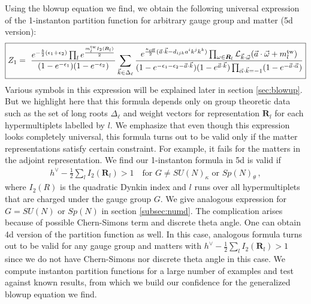 \documentclass[letterpaper, 11pt]{article}
\def\CL{{\cal L}}
\def\e{\epsilon}
\def\w{\omega}
\def\half{\frac{1}{2}}
\begin{document}
Using the blowup equation we find, we obtain the following universal expression of the 1-instanton partition function for arbitrary gauge group and matter (5d version):
\begin{align}
\boxed{
  Z_1=\ \frac{e^{-\frac{b}{2}(\e_1 + \e_2)}\prod_{l}e^{\frac{m^\text{tw}_l I_2(\boldsymbol{R}_l)}{2}}}{(1-e^{-\e_1})(1-e^{-\e_2})} \sum_{\vec{k}\in\Delta_\ell}\frac{e^{\frac{\kappa_{\text{eff}}}{2}(\vec{a}\cdot\vec{k}-d_{ijk}a^ik^jk^k)}\prod_{\w \in \boldsymbol{R}_l} \CL_{\vec{k}\cdot\vec{\w}}(\vec{a}\cdot \vec{\w} + m_{l}^\text{tw})}{(1-e^{-\e_1-\e_2-\vec{a}\cdot\vec{k}})(1-e^{\vec{a}\cdot\vec{k}})\prod_{\vec{\alpha}\cdot \vec{k}=-1}(1-e^{-\vec{a}\cdot\vec{\alpha}})}}
\end{align} 
Various symbols in this expression will be explained later in section \ref{sec:blowup}. But we highlight here that this formula depends only on group theoretic data such as the set of long roots $\Delta_\ell$ and weight vectors for representation $\mathbf{R}_l$ for each hypermultiplets labelled by $l$. 
We emphasize that even though this expression looks completely universal, this formula turns out to be valid only if the matter representations satisfy certain constraint. For example, it fails for the matters in the adjoint representation. We find our 1-instanton formula in 5d is valid if 
\begin{align}
  h^\vee -\frac{1}{2}\sum_l I_2(\mathbf{R}_l) > 1 \quad \textrm{for } G \neq SU(N)_\kappa \textrm{ or } Sp(N)_\theta \ ,
\end{align}
where $I_2(R)$ is the quadratic Dynkin index and $l$ runs over all hypermultiplets that are charged under the gauge group $G$. We give analogous expression for  $G=SU(N)$ or $Sp(N)$ in section \ref{subsec:numd}. The complication arises because of possible Chern-Simons term and discrete theta angle. One can obtain 4d version of the partition function as well. In this case, analogous formula turns out to be valid for any gauge group and matters with $h^\vee - \half \sum_l I_2(\mathbf{R}_l) >1$ since we do not have Chern-Simons nor discrete theta angle in this case. 
We compute instanton partition functions for a large number of examples and test against known results, from which we build our confidence for the generalized blowup equation we find. 
\end{document}
